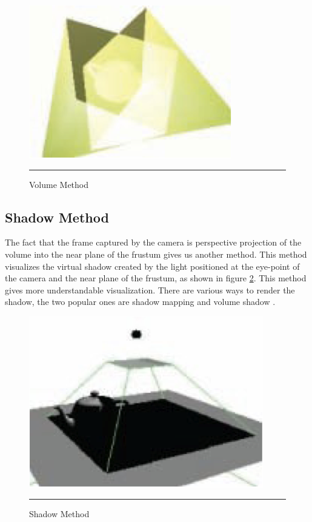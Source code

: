 \begin{figure}[htbp]
	\centering
	\includegraphics{./Primitives/theory_volume.png}
	\rule{35em}{0.5pt}
	\caption[Volume Method]{Volume Method}
	\label{fig:VolumeMethod}
\end{figure}

\subsection{Shadow Method}

The fact that the frame captured by the camera is perspective projection of the volume into the near plane of the frustum gives us another method. This method visualizes the virtual shadow created by the light positioned at the eye-point of the camera and the near plane of the frustum, as shown in figure \ref{fig:ShadowMethod}. This method gives more understandable visualization. There are various ways to render the shadow, the two popular ones are shadow mapping \citep{Reference7} \citep{Reference8} and volume shadow \citep{Reference9}.

\begin{figure}[htbp]
	\centering
	\includegraphics{./Primitives/theory_shadow.png}
	\rule{35em}{0.5pt}
	\caption[Shadow Method]{Shadow Method}
	\label{fig:ShadowMethod}
\end{figure}

